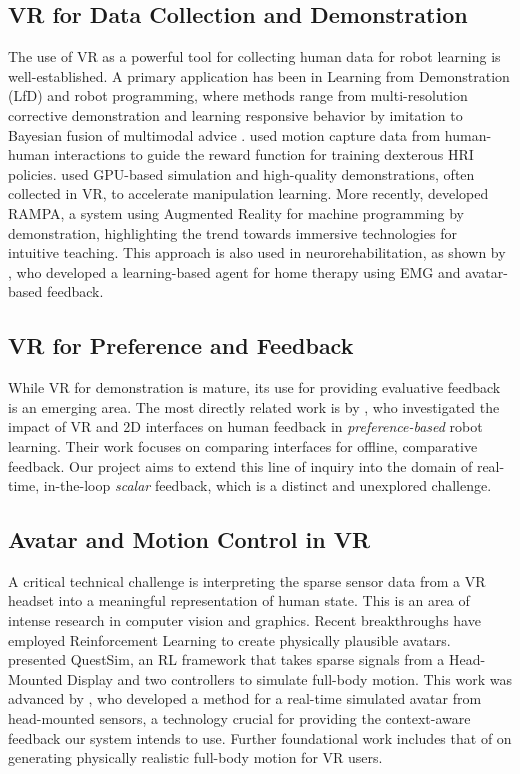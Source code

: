 \documentclass[../report.tex]{subfiles}
\begin{document}
    \subsection{VR for Data Collection and Demonstration}
    The use of VR as a powerful tool for collecting human data for robot learning is well-established. A primary application has been in Learning from Demonstration (LfD) and robot programming, where methods range from multi-resolution corrective demonstration \citep{6225294} and learning responsive behavior by imitation \citep{6696819} to Bayesian fusion of multimodal advice \citep{9794595}. \citet{Christen2019} used motion capture data from human-human interactions to guide the reward function for training dexterous HRI policies. \citet{Mosbach2022} used GPU-based simulation and high-quality demonstrations, often collected in VR, to accelerate manipulation learning. More recently, \citet{10904309} developed RAMPA, a system using Augmented Reality for machine programming by demonstration, highlighting the trend towards immersive technologies for intuitive teaching. This approach is also used in neurorehabilitation, as shown by \citet{8009418}, who developed a learning-based agent for home therapy using EMG and avatar-based feedback.

    \subsection{VR for Preference and Feedback}
    While VR for demonstration is mature, its use for providing evaluative feedback is an emerging area. The most directly related work is by \citet{Heuvel2025}, who investigated the impact of VR and 2D interfaces on human feedback in \textit{preference-based} robot learning. Their work focuses on comparing interfaces for offline, comparative feedback. Our project aims to extend this line of inquiry into the domain of real-time, in-the-loop \textit{scalar} feedback, which is a distinct and unexplored challenge.

    \subsection{Avatar and Motion Control in VR}
    A critical technical challenge is interpreting the sparse sensor data from a VR headset into a meaningful representation of human state. This is an area of intense research in computer vision and graphics. Recent breakthroughs have employed Reinforcement Learning to create physically plausible avatars. \citet{Winkler2022} presented QuestSim, an RL framework that takes sparse signals from a Head-Mounted Display and two controllers to simulate full-body motion. This work was advanced by \citet{Luo2024}, who developed a method for a real-time simulated avatar from head-mounted sensors, a technology crucial for providing the context-aware feedback our system intends to use. Further foundational work includes that of \citet{Ye2022} on generating physically realistic full-body motion for VR users.
\end{document}
